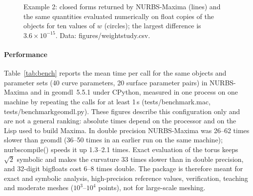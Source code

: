 \documentclass[preprint,12pt]{elsarticle}
\newcommand{\pkg}{NURBS-Maxima}
\newcommand{\code}[1]{{\ttfamily\def\_{\textunderscore\allowbreak}#1}}
\begin{document}
\begin{figure}[t]
\centering
{}
\caption{Example 2: closed forms returned by \pkg{} (lines) and the same quantities evaluated numerically on float copies of the objects for ten values of $w$ (circles); the largest difference is $3.6\times10^{-15}$. Data: \code{figures/weight\_study.csv}.}
\label{fig:weight}
\end{figure}

\paragraph{Performance} Table~\ref{tab:bench} reports the mean time per call for the same objects and parameter sets (40 curve parameters, 20 surface parameter pairs) in \pkg{} and in geomdl~5.5.1 under CPython, measured in one process on one machine by repeating the calls for at least 1\,s (\code{tests/benchmark.mac}, \code{tests/benchmark\_geomdl.py}). These figures describe this configuration only and are not a general ranking: absolute times depend on the processor and on the Lisp used to build Maxima. In double precision \pkg{} was 26--62 times slower than geomdl (36--50 times in an earlier run on the same machine); \code{nurbs\_compile()} speeds it up 1.3--2.1 times. Exact evaluation of the torus keeps $\sqrt2$ symbolic and makes the curvature 33 times slower than in double precision, and 32-digit bigfloats cost 6--8 times double. The package is therefore meant for exact and symbolic analysis, high-precision reference values, verification, teaching and moderate meshes ($10^3$--$10^4$ points), not for large-scale meshing.
\end{document}
